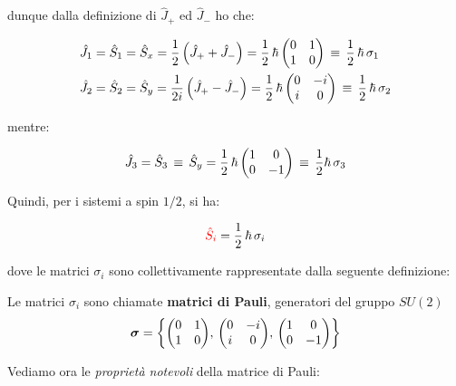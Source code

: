 \begin{itemize}
		dunque dalla definizione di $\hat{J}_+$ ed $\hat{J}_-$ ho che:
		
	\begin{align*}
		& \hat{J}_1 = \hat{S}_1 = \hat{S}_x  = \frac{1}{2} \, \qty(\hat{J}_+ + \hat{J}_-) = \frac{1}{2} \, \hbar \, \mqty( 0 & 1 \\ 1 & 0 ) \, \equiv \, \frac{1}{2} \, \hbar \, \sigma_1 \\
		& \hat{J}_2 = \hat{S}_2 = \hat{S}_y  = \frac{1}{2i} \, \qty(\hat{J}_+ - \hat{J}_-) = \frac{1}{2} \, \hbar \, \mqty( 0 & -i \\ i & 0 ) \, \equiv \, \frac{1}{2} \, \hbar \, \sigma_2
	\end{align*}
		
		mentre:
		
	\begin{align*}
		\hat{J}_3 = \hat{S}_3 \, \equiv \, \hat{S}_y = \frac{1}{2} \, \hbar \, \mqty( 1 & 0 \\ 0 & -1 ) \, \equiv \, \frac{1}{2} \hbar \, \sigma_3
	\end{align*}

\end{itemize}

\begin{mydef}
	Quindi, per i sistemi a spin $1/2$, si ha:

\begin{align*}
	\textcolor{red}{\hat{S}_i }= \frac{1}{2} \, \hbar \, \sigma_i
\end{align*}
\end{mydef}

	dove le matrici $\sigma_i$ sono collettivamente rappresentate dalla seguente definizione:

\begin{mydef}
	Le matrici $\sigma_i$ sono chiamate \textbf{matrici di Pauli}, generatori del gruppo $SU(2)$
\begin{align*}
	\vb*{\sigma} = \qty{     \mqty( 0 & 1 \\ 1 & 0), \, \mqty( 0 & -i \\ i & 0 ) , \, \mqty( 1 & 0 \\ 0 & -1 )  }
\end{align*}
\end{mydef}

	Vediamo ora le \textit{proprietà notevoli} della matrice di Pauli:
	
